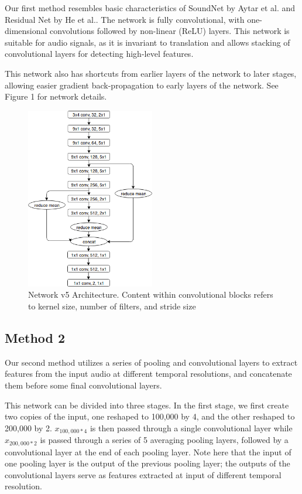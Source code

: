 \documentclass[10pt,twocolumn,letterpaper]{article}
\begin{document}
Our first method resembles basic characteristics of SoundNet by Aytar et
al.\cite{soundnet} and Residual Net by He et al.\cite{residual_net}. The
network is fully convolutional, with one-dimensional convolutions followed
by non-linear (ReLU) layers. This network is suitable for audio
signals, as it is invariant to translation and allows stacking of
convolutional layers for detecting high-level features.

This network also has shortcuts from earlier layers of the network to later
stages, allowing easier gradient back-propagation to early layers of the
network. See Figure 1 for network details.

\begin{figure}[t]
	\centering
	\includegraphics[width=0.5\textwidth]{v5_diagram}
	\caption{Network v5 Architecture. Content within convolutional blocks
	refers to kernel size, number of filters, and stride size}
\end{figure}


\subsection{Method 2}

Our second method utilizes a series of pooling and convolutional layers to
extract features from the input audio at different temporal resolutions,
and concatenate them before some final convolutional layers.

This network can be divided into three stages. In the first stage, we first
create two copies of the input, one reshaped to 100,000 by 4, and the other
reshaped to 200,000 by 2. \(x_{100,000*4}\) is then passed through a single
convolutional layer while \(x_{200,000*2}\) is passed through a series of 5
averaging pooling layers, followed by a convolutional layer at the end of
each pooling layer. Note here that the input of one pooling layer is the
output of the previous pooling layer; the outputs of the convolutional
layers serve as features extracted at input of different temporal
resolution.
\end{document}
